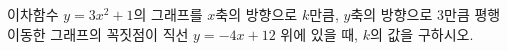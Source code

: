 이차함수 $y=3x^2+1$의 그래프를 $x$축의 방향으로 $k$만큼, $y$축의 방향으로 $3$만큼 평행이동한 그래프의 꼭짓점이 직선 $y=-4x+12$ 위에 있을 때, $k$의 값을 구하시오.
